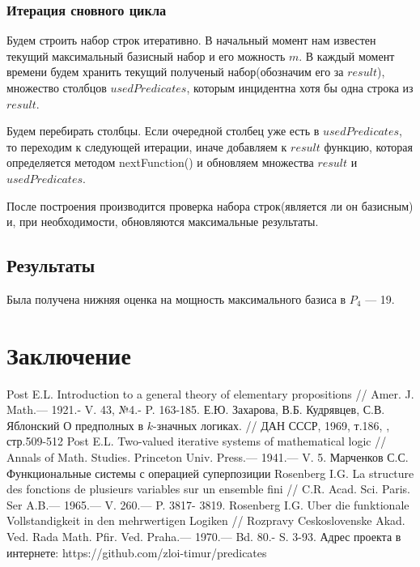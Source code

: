 \documentclass[a4paper,14pt]{extreport}
\begin{document}
\subsection{Итерация сновного цикла}
Будем строить набор строк итеративно. В начальный момент нам известен текущий максимальный базисный набор и его можность $m$. В каждый момент времени будем хранить текущий полученый набор(обозначим его за $result$), множество столбцов $usedPredicates$, которым инцидентна хотя бы одна строка из $result$.

Будем перебирать столбцы. Если очередной столбец уже есть в $usedPredicates$, то переходим к следующей итерации, иначе добавляем к $result$ функцию, которая определяется методом nextFunction() и обновляем множества $result$ и $usedPredicates$.

После построения производится проверка набора строк(является ли он базисным) и, при необходимости, обновляются максимальные результаты.
 
\section{Результаты}
Была получена нижняя оценка на мощность максимального базиса в $P_4$ --- 19.


\chapter{Заключение}



\newpage
{}
\begin{thebibliography}{9}
	Post E.L. Introduction to a general theory of elementary propositions // 
Amer. J. Math.— 1921.- V. 43, №4.- P. 163-185. 
 Е.Ю. Захарова, В.Б. Кудрявцев, С.В. Яблонский О предполных в $k$-значных логиках. // ДАН СССР, 1969, т.186, , стр.509-512 
	Post E.L. Two-valued iterative systems of mathematical logic // Annals of 
Math. Studies. Princeton Univ. Press.— 1941.— V. 5. 
 Марченков С.С. Функциональные системы с операцией суперпозиции
	Rosenberg I.G. La structure des fonctions de plusieurs variables sur un ensemble fini // C.R. Acad. Sci. Paris. Ser A.B.— 1965.— V. 260.— P. 3817- 3819. 
	Rosenberg I.G. Uber die funktionale Vollstandigkeit in den mehrwertigen Logiken // Rozpravy Ceskoslovenske Akad. Ved. Rada Math. Pfir. Ved. Praha.— 1970.— Bd. 80.- S. 3-93. 
 Адрес проекта в интернете: https://github.com/zloi-timur/predicates 


\end{thebibliography}
\end{document}
